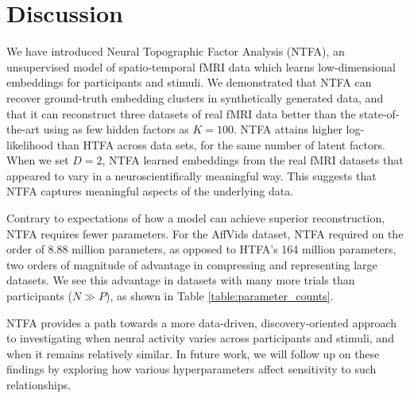 \documentclass[twoside]{article}
\begin{document}
\vspace{-1em}
\section{Discussion}
\vspace{-1em}

We have introduced Neural Topographic Factor Analysis (NTFA), an unsupervised model of spatio-temporal fMRI data which learns low-dimensional embeddings for participants and stimuli.  We demonstrated that NTFA can recover ground-truth embedding clusters in synthetically generated data, and that it can reconstruct three datasets of real fMRI data better than the state-of-the-art using as few hidden factors as $K=100$.  NTFA attains higher log-likelihood than HTFA across data sets, for the same number of latent factors. When we set $D=2$, NTFA learned embeddings from the real fMRI datasets that appeared to vary in a neuroscientifically meaningful way.  This suggests that NTFA captures meaningful aspects of the underlying data.

Contrary to expectations of how a model can achieve superior reconstruction, NTFA requires fewer parameters.  For the AffVids dataset, NTFA required on the order of 8.88 million parameters, as opposed to HTFA's 164 million parameters, two orders of magnitude of advantage in compressing and representing large datasets.  We see this advantage in datasets with many more trials than participants ($N \gg P$), as shown in Table \ref{table:parameter_counts}.

NTFA provides a path towards a more data-driven, discovery-oriented approach to investigating when neural activity varies across participants and stimuli, and when it remains relatively similar.  In future work, we will follow up on these findings by exploring how various hyperparameters affect sensitivity to such relationships.

\end{document}
